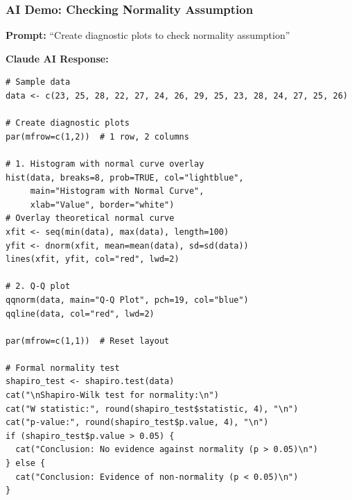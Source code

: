 \documentclass{beamer}
\begin{document}
\begin{frame}[fragile]
\frametitle{AI Demo: Checking Normality Assumption}
\textbf{Prompt:} ``Create diagnostic plots to check normality assumption''

\vspace{0.2cm}
\textbf{Claude AI Response:}
\tiny
\begin{verbatim}
# Sample data
data <- c(23, 25, 28, 22, 27, 24, 26, 29, 25, 23, 28, 24, 27, 25, 26)

# Create diagnostic plots
par(mfrow=c(1,2))  # 1 row, 2 columns

# 1. Histogram with normal curve overlay
hist(data, breaks=8, prob=TRUE, col="lightblue",
     main="Histogram with Normal Curve",
     xlab="Value", border="white")
# Overlay theoretical normal curve
xfit <- seq(min(data), max(data), length=100)
yfit <- dnorm(xfit, mean=mean(data), sd=sd(data))
lines(xfit, yfit, col="red", lwd=2)

# 2. Q-Q plot
qqnorm(data, main="Q-Q Plot", pch=19, col="blue")
qqline(data, col="red", lwd=2)

par(mfrow=c(1,1))  # Reset layout

# Formal normality test
shapiro_test <- shapiro.test(data)
cat("\nShapiro-Wilk test for normality:\n")
cat("W statistic:", round(shapiro_test$statistic, 4), "\n")
cat("p-value:", round(shapiro_test$p.value, 4), "\n")
if (shapiro_test$p.value > 0.05) {
  cat("Conclusion: No evidence against normality (p > 0.05)\n")
} else {
  cat("Conclusion: Evidence of non-normality (p < 0.05)\n")
}
\end{verbatim}
\end{frame}
\end{document}
